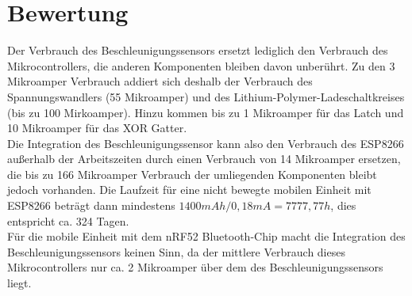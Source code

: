 \section{Bewertung}
Der Verbrauch des Beschleunigungssensors ersetzt lediglich den Verbrauch des Mikrocontrollers, die anderen Komponenten bleiben davon unberührt.
Zu den 3 Mikroamper Verbrauch addiert sich deshalb der Verbrauch des Spannungswandlers (55 Mikroamper) und des Lithium-Polymer-Ladeschaltkreises (bis zu 100 Mirkoamper).
Hinzu kommen bis zu 1 Mikroamper für das Latch und 10 Mikroamper für das XOR Gatter.\\
Die Integration des Beschleunigungssensor kann also den Verbrauch des ESP8266 außerhalb der Arbeitszeiten durch einen Verbrauch von 14 Mikroamper ersetzen, die bis zu 166 Mikroamper Verbrauch der umliegenden Komponenten bleibt jedoch vorhanden.
Die Laufzeit für eine nicht bewegte mobilen Einheit mit ESP8266 beträgt dann mindestens $1400mAh / 0,18mA = 7777,77h$, dies entspricht ca. 324 Tagen.\\
Für die mobile Einheit mit dem nRF52 Bluetooth-Chip macht die Integration des Beschleunigungssensors keinen Sinn, da der mittlere Verbrauch dieses Mikrocontrollers nur ca. 2 Mikroamper über dem des Beschleunigungssensors liegt.

